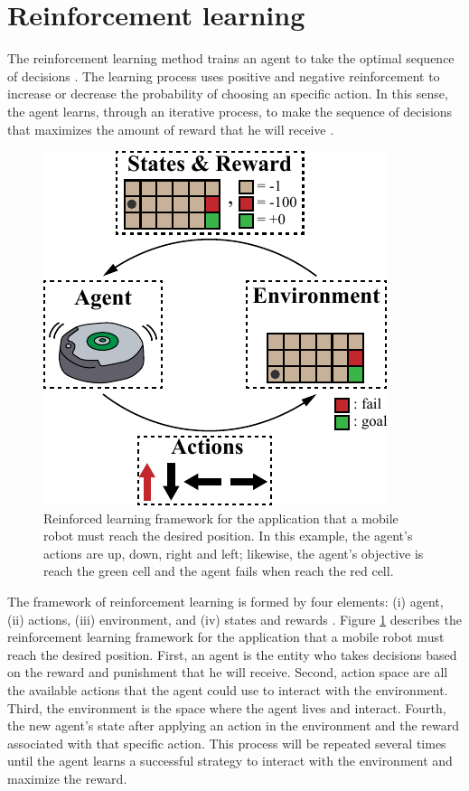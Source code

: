 \graphicspath{{images/methodology/}}
\section{Reinforcement learning}
The reinforcement learning method trains an agent to take the optimal sequence of decisions \cite{sutton2018reinforcement}. The learning process uses positive and negative reinforcement to increase or decrease the probability of choosing an specific action. In this sense, the agent learns, through an iterative process, to make the sequence of decisions that maximizes the amount of reward that he will receive \cite{sutton2018reinforcement}.

\begin{figure}[h!]
	\centering
	\includegraphics{reinforcement_learning_diagram.pdf}
	\caption{Reinforced learning framework for the application that a mobile robot must reach the desired position. In this example, the agent's actions are up, down, right and left; likewise, the agent's objective is reach the green cell and the agent fails when reach the red cell.}
	\label{fig:RL_framework}
\end{figure}

The framework of reinforcement learning is formed by four elements: (i) agent, (ii) actions, (iii) environment, and (iv) states and rewards \cite{sutton2018reinforcement}. Figure \ref{fig:RL_framework} describes the reinforcement learning framework for the application that a mobile robot must reach the desired position. First, an agent is the entity who takes decisions based on the reward and punishment that he will receive. Second, action space are all the available actions that the agent could use to interact with the environment. Third, the environment is the space where the agent lives and interact. Fourth,  the new agent's state after applying an action in the environment and the reward associated with that specific action. This process will be repeated several times until the agent learns a successful strategy to interact with the environment and maximize the reward.


